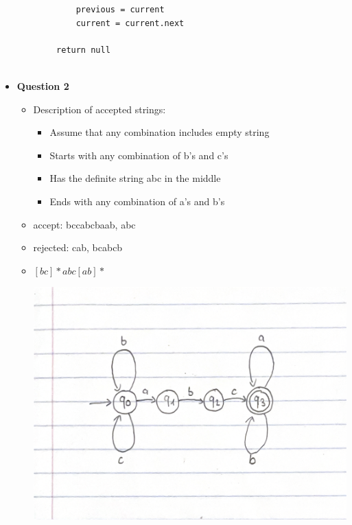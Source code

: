 \documentclass{article}
\begin{document}
\begin{itemize}
\begin{lstlisting}
            previous = current
            current = current.next
        
        return null


    \end{lstlisting}

    \item\textbf{ Question 2}

    \begin{itemize}
        \item[] Description of accepted strings:
            \begin{itemize}
                \item Assume that any combination includes empty string
                \item Starts with any combination of b's and c's
                \item Has the definite string abc in the middle
                \item Ends with any combination of a's and b's
            \end{itemize}

        \item[] accept:     bccabcbaab, abc

        \item[] rejected:   cab, bcabcb

        \item[] $[bc]*abc[ab]*$

        \includegraphics[scale=0.2]{Quiz2_Q2.png}

    \end{itemize}
    



\end{itemize}
\end{document}
